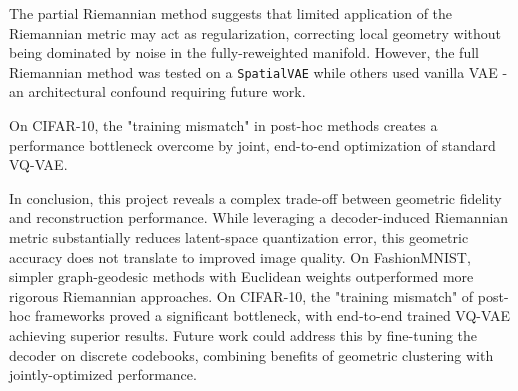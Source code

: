 \documentclass{article}
\begin{document}
The partial Riemannian method suggests that limited application of the Riemannian metric may act as regularization, correcting local geometry without being dominated by noise in the fully-reweighted manifold. However, the full Riemannian method was tested on a \texttt{SpatialVAE} while others used vanilla VAE - an architectural confound requiring future work.

On CIFAR-10, the "training mismatch" in post-hoc methods creates a performance bottleneck overcome by joint, end-to-end optimization of standard VQ-VAE.

In conclusion, this project reveals a complex trade-off between geometric fidelity and reconstruction performance. While leveraging a decoder-induced Riemannian metric substantially reduces latent-space quantization error, this geometric accuracy does not translate to improved image quality. On FashionMNIST, simpler graph-geodesic methods with Euclidean weights outperformed more rigorous Riemannian approaches. On CIFAR-10, the "training mismatch" of post-hoc frameworks proved a significant bottleneck, with end-to-end trained VQ-VAE achieving superior results. Future work could address this by fine-tuning the decoder on discrete codebooks, combining benefits of geometric clustering with jointly-optimized performance.



\end{document}
